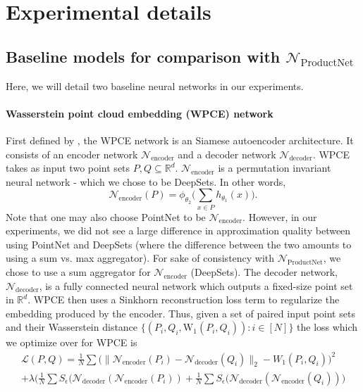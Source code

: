 \documentclass[12pt]{article}
\newcommand{\R}{\mathbb R}
\newcommand{\Network}{\mathcal{N}_{\mathrm{ProductNet}}}
\begin{document}
\section{Experimental details}
\label{appendix:experiments}
\subsection{Baseline models for comparison with $\Network$}
Here, we will detail two baseline neural networks in our experiments.
\paragraph{Wasserstein point cloud embedding (WPCE) network} First defined by \citep{kawano2020learning}, the WPCE network is an Siamese autoencoder architecture. It consists of an encoder network $\mathcal{N}_{\mathrm{encoder}}$ and a decoder network $\mathcal{N}_{\mathrm{decoder}}$. WPCE takes as input two point sets $P, Q \subseteq \R^d$.  $\mathcal{N}_{\mathrm{encoder}}$ is a permutation invariant neural network - which we chose to be DeepSets. In other words,
\begin{equation*}
    \mathcal{N}_{\mathrm{encoder}}(P) = \phi_{\theta_2}\Big( \sum_{x \in P} h_{\theta_1}(x) \Big).
\end{equation*}
Note that one may also choose PointNet to be $\mathcal{N}_{\mathrm{encoder}}$. However, in our experiments, we did not see a large difference in approximation quality between using PointNet and DeepSets (where the difference between the two amounts to using a sum vs. max aggregator). For sake of consistency with $\Network$, we chose to use a sum aggregator for $\mathcal{N}_{\mathrm{encoder}}$ (DeepSets). The decoder network, $\mathcal{N}_{\mathrm{decoder}}$, is a fully connected neural network which outputs a fixed-size point set in $\R^d$. WPCE then uses a Sinkhorn reconstruction loss term to regularize the embedding produced by the encoder. Thus, given a set of paired input point sets and their Wasserstein distance $\{(P_i, Q_i, \mathrm{W}_1(P_i, Q_i)) : i \in [N]\}$ the loss which we optimize over for WPCE is 
\begin{multline}
\label{eq:WPCE-loss}
    \mathcal{L}(P, Q) = \frac{1}{N} \sum \Big(\|\mathcal{N}_{\mathrm{encoder}}(P_i) - \mathcal{N}_{\mathrm{decoder}}(Q_i)\|_2 -  W_1(P_i, Q_i)\Big)^2 \\+ \lambda \Big(\frac{1}{N} \sum S_{\epsilon}(\mathcal{N}_{\mathrm{decoder}}(\mathcal{N}_{\mathrm{encoder}}(P_i)) + \frac{1}{N} \sum S_{\epsilon}(\mathcal{N}_{\mathrm{decoder}}(\mathcal{N}_{\mathrm{encoder}}(Q_i)) \Big)
\end{multline}
\end{document}
